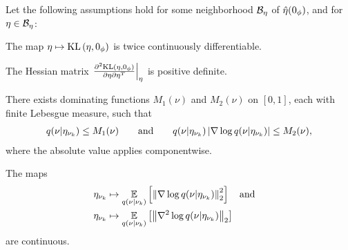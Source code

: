 \begin{thm}
%
Let the following assumptions hold for some neighborhood $\mathcal{B}_\eta$
of $\hat\eta(0_\phi)$, and for $\eta \in \mathcal{B}_\eta$:
%
\begin{assu}
    The map $\eta \mapsto \mathrm{KL}\left(\eta, 0_\phi\right)$ is twice
    continuously differentiable.
\end{assu}
%
\begin{assu}
    The Hessian matrix $\left.\frac{\partial^2 \mathrm{KL}\left(\eta, 0_\phi\right)}{\partial \eta \partial \eta^T}\right\vert_{\eta}$ is positive definite.
\end{assu}
%
\begin{assu}
%
There exists dominating functions $M_1(\nu)$ and $M_2(\nu)$ on $[0,1]$, each
with finite Lebesgue measure, such that
%
\begin{align*}
%
\q(\nu \vert \etanuk) \le M_1(\nu)
\mathand
\q(\nu \vert \etanuk) \abs{\nabla \log \q(\nu \vert \etanuk)} \le M_2(\nu),
%
\end{align*}
%
where the absolute value applies componentwise.
%
\end{assu}
%
\begin{assu}
%
The maps
%
\begin{align*}
%
\etanuk \mapsto{}& \expect{\q(\nu \vert \nuk)}{\norm{\nabla \log \q(\nu
\vert \etanuk)}_2^2} \mathtxt{and}\\
\etanuk \mapsto{}& \expect{\q(\nu \vert
\nuk)}{\norm{\nabla^2 \log \q(\nu \vert \etanuk)}_2}
%
\end{align*}
%
are continuous.
%
\end{assu}

\end{thm}
